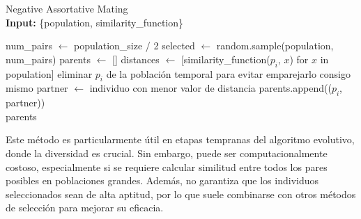 \begin{algorithm}[H]
	\caption{Negative Assortative Mating \\ \textbf{Input:} \{population, similarity\_function\}}
	\begin{algorithmic}[1]
		\State num\_pairs $\gets$ population\_size / 2
		\State selected $\gets$ random.sample(population, num\_pairs)
		\State parents $\gets$ []
		\State distances $\gets$ [similarity\_function($p_i$, $x$) for $x$ in population]
		\State eliminar $p_i$ de la población temporal para evitar emparejarlo consigo mismo
		\State partner $\gets$ individuo con menor valor de distancia
		\State parents.append(($p_i$, partner))
		\EndFor \\
		\Return parents
	\end{algorithmic}
	\label{alg:negative_assortative}
\end{algorithm}

Este método es particularmente útil en etapas tempranas del algoritmo evolutivo, donde la diversidad es crucial. Sin embargo, puede ser computacionalmente costoso, especialmente si se requiere calcular similitud entre todos los pares posibles en poblaciones grandes. Además, no garantiza que los individuos seleccionados sean de alta aptitud, por lo que suele combinarse con otros métodos de selección para mejorar su eficacia.
